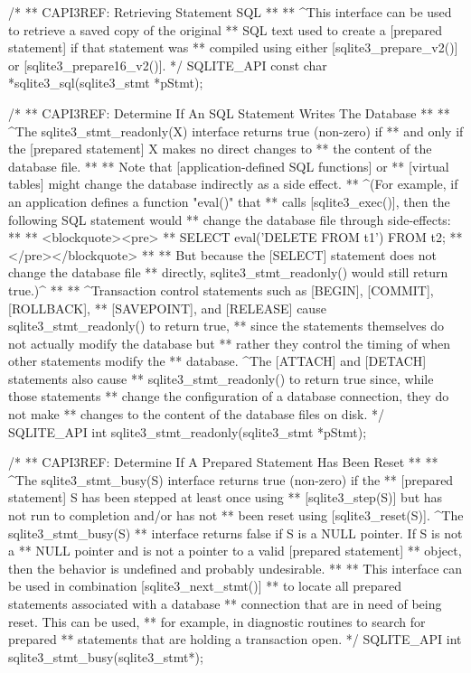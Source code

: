 \begin{Codex}[label=sqlite3.h,numbers=left]
{/*
** CAPI3REF: Retrieving Statement SQL
**
** ^This interface can be used to retrieve a saved copy of the original
** SQL text used to create a [prepared statement] if that statement was
** compiled using either [sqlite3_prepare_v2()] or [sqlite3_prepare16_v2()].
*/
SQLITE_API const char *sqlite3_sql(sqlite3_stmt *pStmt);

/*
** CAPI3REF: Determine If An SQL Statement Writes The Database
**
** ^The sqlite3_stmt_readonly(X) interface returns true (non-zero) if
** and only if the [prepared statement] X makes no direct changes to
** the content of the database file.
**
** Note that [application-defined SQL functions] or
** [virtual tables] might change the database indirectly as a side effect.  
** ^(For example, if an application defines a function "eval()" that 
** calls [sqlite3_exec()], then the following SQL statement would
** change the database file through side-effects:
**
** <blockquote><pre>
**    SELECT eval('DELETE FROM t1') FROM t2;
** </pre></blockquote>
**
** But because the [SELECT] statement does not change the database file
** directly, sqlite3_stmt_readonly() would still return true.)^
**
** ^Transaction control statements such as [BEGIN], [COMMIT], [ROLLBACK],
** [SAVEPOINT], and [RELEASE] cause sqlite3_stmt_readonly() to return true,
** since the statements themselves do not actually modify the database but
** rather they control the timing of when other statements modify the 
** database.  ^The [ATTACH] and [DETACH] statements also cause
** sqlite3_stmt_readonly() to return true since, while those statements
** change the configuration of a database connection, they do not make 
** changes to the content of the database files on disk.
*/
SQLITE_API int sqlite3_stmt_readonly(sqlite3_stmt *pStmt);

/*
** CAPI3REF: Determine If A Prepared Statement Has Been Reset
**
** ^The sqlite3_stmt_busy(S) interface returns true (non-zero) if the
** [prepared statement] S has been stepped at least once using 
** [sqlite3_step(S)] but has not run to completion and/or has not 
** been reset using [sqlite3_reset(S)].  ^The sqlite3_stmt_busy(S)
** interface returns false if S is a NULL pointer.  If S is not a 
** NULL pointer and is not a pointer to a valid [prepared statement]
** object, then the behavior is undefined and probably undesirable.
**
** This interface can be used in combination [sqlite3_next_stmt()]
** to locate all prepared statements associated with a database 
** connection that are in need of being reset.  This can be used,
** for example, in diagnostic routines to search for prepared 
** statements that are holding a transaction open.
*/
SQLITE_API int sqlite3_stmt_busy(sqlite3_stmt*);

}
\end{Codex}
